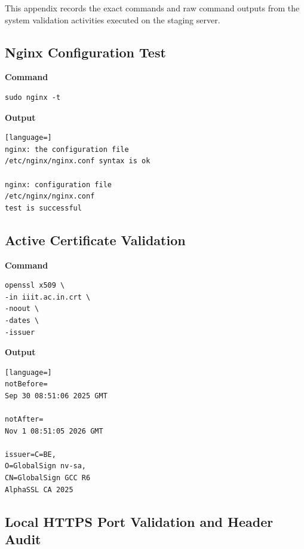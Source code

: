 \documentclass[11pt,a4paper,DIV=16,headings=normal,parskip=half]{scrartcl}
\begin{document}
This appendix records the exact commands and raw command outputs from the
system validation activities executed on the staging server.

\subsection{Nginx Configuration Test}

\noindent
\begin{minipage}[t]{0.32\textwidth}
\textbf{Command}
\begin{lstlisting}
sudo nginx -t
\end{lstlisting}
\end{minipage}
\hfill
\begin{minipage}[t]{0.64\textwidth}
\textbf{Output}
\begin{lstlisting}[language=]
nginx: the configuration file
/etc/nginx/nginx.conf syntax is ok

nginx: configuration file
/etc/nginx/nginx.conf
test is successful
\end{lstlisting}
\end{minipage}


\subsection{Active Certificate Validation}

\noindent
\begin{minipage}[t]{0.32\textwidth}
\textbf{Command}
\begin{lstlisting}
openssl x509 \
-in iiit.ac.in.crt \
-noout \
-dates \
-issuer
\end{lstlisting}
\end{minipage}
\hfill
\begin{minipage}[t]{0.64\textwidth}
\textbf{Output}
\begin{lstlisting}[language=]
notBefore=
Sep 30 08:51:06 2025 GMT

notAfter=
Nov 1 08:51:05 2026 GMT

issuer=C=BE,
O=GlobalSign nv-sa,
CN=GlobalSign GCC R6
AlphaSSL CA 2025
\end{lstlisting}
\end{minipage}


\subsection{Local HTTPS Port Validation and Header Audit}
\end{document}
